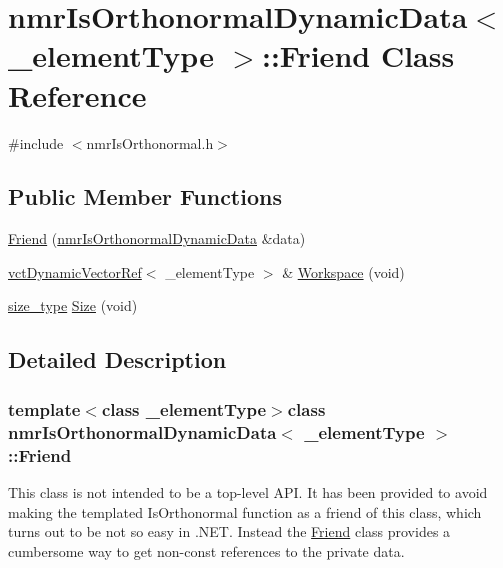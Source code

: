 \hypertarget{classnmr_is_orthonormal_dynamic_data_1_1_friend}{}\section{nmr\+Is\+Orthonormal\+Dynamic\+Data$<$ \+\_\+element\+Type $>$\+:\+:Friend Class Reference}
\label{classnmr_is_orthonormal_dynamic_data_1_1_friend}


{\ttfamily \#include $<$nmr\+Is\+Orthonormal.\+h$>$}

\subsection*{Public Member Functions}
\begin{DoxyCompactItemize}
\item 
\hyperlink{classnmr_is_orthonormal_dynamic_data_1_1_friend_ae637d50371e5b192dcbebde961803deb}{Friend} (\hyperlink{classnmr_is_orthonormal_dynamic_data}{nmr\+Is\+Orthonormal\+Dynamic\+Data} \&data)
\item 
\hyperlink{classvct_dynamic_vector_ref}{vct\+Dynamic\+Vector\+Ref}$<$ \+\_\+element\+Type $>$ \& \hyperlink{classnmr_is_orthonormal_dynamic_data_1_1_friend_aa75a9b79bf63019e7616558b2fca2b9b}{Workspace} (void)
\item 
\hyperlink{classnmr_is_orthonormal_dynamic_data_ae69581f9b270b49b1cd1d16ff29a5409}{size\+\_\+type} \hyperlink{classnmr_is_orthonormal_dynamic_data_1_1_friend_a7f10ac301fb4b5ffa966e760fa37c892}{Size} (void)
\end{DoxyCompactItemize}


\subsection{Detailed Description}
\subsubsection*{template$<$class \+\_\+element\+Type$>$class nmr\+Is\+Orthonormal\+Dynamic\+Data$<$ \+\_\+element\+Type $>$\+::\+Friend}

This class is not intended to be a top-\/level A\+P\+I. It has been provided to avoid making the templated Is\+Orthonormal function as a friend of this class, which turns out to be not so easy in .N\+E\+T. Instead the \hyperlink{classnmr_is_orthonormal_dynamic_data_1_1_friend}{Friend} class provides a cumbersome way to get non-\/const references to the private data. 

